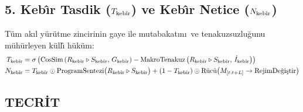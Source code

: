\documentclass[11pt,a4paper]{article}
\begin{document}
\subsection{5. Keb\^{\i}r Tasdik ($T_{\text{keb\^{\i}r}}$) ve Keb\^{\i}r Netice ($N_{\text{keb\^{\i}r}}$)}
T\"um ak\i l y\"ur\"utme zincirinin gaye ile mutabakat\i n\i\ ve tenakuzsuzlu\u{g}unu m\"uh\"urleyen k\"ull\^{\i} h\"uk\"um:
\begin{align}
T_{\text{keb\^{\i}r}} &= \sigma\left(\text{CosSim}\left(R_{\text{keb\^{\i}r}} \triangleright S_{\text{keb\^{\i}r}},\, G_{\text{keb\^{\i}r}}\right) - \text{MakroTenakuz}\left(R_{\text{keb\^{\i}r}} \triangleright S_{\text{keb\^{\i}r}},\, \dot{I}_{\text{keb\^{\i}r}}\right)\right) \\
N_{\text{keb\^{\i}r}} &= T_{\text{keb\^{\i}r}} \odot \text{ProgramSentezi}\big(R_{\text{keb\^{\i}r}} \triangleright S_{\text{keb\^{\i}r}}\big) + (1 - T_{\text{keb\^{\i}r}}) \odot \text{R\"uc\^{u}}\big(M_{[t:t+L]} \to \text{RejimDe\u{g}i\c{s}tir}\big)
\end{align}











\subsection{TECRİT}
\end{document}
